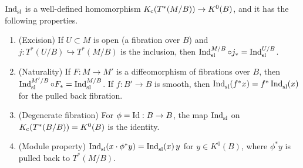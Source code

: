 \begin{theorem}\label{scindex:thm:Indsl}
  $\operatorname{Ind}^{}_{\mathrm{sl}}$ is a well-defined homomorphism $K_{\mathrm{c}}(T^*(M/B))\to K^0(B)$, and it has
  the following properties.
  \begin{enumerate}[label=(\roman*)]
  \item (Excision) If $U\subset M$ is open (a fibration over $B$) and
    $j:T^*(U/B)\hookrightarrow T^*(M/B)$ is the inclusion, then
    $\operatorname{Ind}^{M/B}_{\mathrm{sl}}\circ j_*=\operatorname{Ind}^{U/B}_{\mathrm{sl}}$.
  \item (Naturality) If $F:M\to M'$ is a diffeomorphism of fibrations over $B$,
    then $\operatorname{Ind}^{M'/B}_{\mathrm{sl}}\circ F_*=\operatorname{Ind}^{M/B}_{\mathrm{sl}}$. If $f:B'\to B$ is smooth,
    then $\operatorname{Ind}^{}_{\mathrm{sl}}(f^*x)=f^*\operatorname{Ind}^{}_{\mathrm{sl}}(x)$ for the pulled back fibration.
  \item (Degenerate fibration) For $\phi=\operatorname{Id}:B\to B$, the map
    $\operatorname{Ind}^{}_{\mathrm{sl}}$ on $K_{\mathrm{c}}(T^*(B/B))=K^0(B)$ is the identity.
  \item (Module property) $\operatorname{Ind}^{}_{\mathrm{sl}}(x\cdot\phi^*y)=\operatorname{Ind}^{}_{\mathrm{sl}}(x)\,y$ for $y\in K^0(B)$,
    where $\phi^*y$ is pulled back to $T^*(M/B)$.
  \end{enumerate}
\end{theorem}
